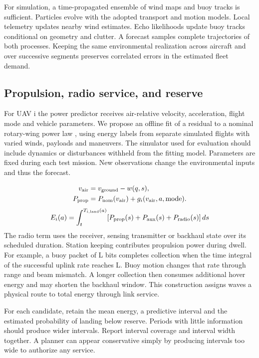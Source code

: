 \documentclass[journal]{IEEEtran}
\begin{document}
For simulation, a time-propagated ensemble of wind maps and buoy tracks is sufficient. Particles evolve with the adopted transport and motion models. Local telemetry updates nearby wind estimates. Echo likelihoods update buoy tracks conditional on geometry and clutter. A forecast samples complete trajectories of both processes. Keeping the same environmental realization across aircraft and over successive segments preserves correlated errors in the estimated fleet demand.

\subsection{Propulsion, radio service, and reserve}
For UAV i the power predictor receives air-relative velocity, acceleration, flight mode and vehicle parameters. We propose an offline fit of a residual to a nominal rotary-wing power law \cite{r3}, using energy labels from separate simulated flights with varied winds, payloads and maneuvers. The simulator used for evaluation should include dynamics or disturbances withheld from the fitting model. Parameters are fixed during each test mission. New observations change the environmental inputs and thus the forecast.

\begin{equation}\begin{aligned}v_{\rm air}&=v_{\rm ground}-w(q,s),\\P_{\rm prop}&=P_{\rm nom}(v_{\rm air})+g_i(v_{\rm air},a,\mathrm{mode}).\end{aligned}\end{equation}
\begin{equation}E_i(a)=\int_{t}^{T_{i,\rm land}(a)}[P_{\rm prop}(s)+P_{\rm aux}(s)+P_{\rm radio}(s)]\,ds\end{equation}
The radio term uses the receiver, sensing transmitter or backhaul state over its scheduled duration. Station keeping contributes propulsion power during dwell. For example, a buoy packet of L bits completes collection when the time integral of the successful uplink rate reaches L. Buoy motion changes that rate through range and beam mismatch. A longer collection then consumes additional hover energy and may shorten the backhaul window. This construction assigns waves a physical route to total energy through link service.

For each candidate, retain the mean energy, a predictive interval and the estimated probability of landing below reserve. Periods with little information should produce wider intervals. Report interval coverage and interval width together. A planner can appear conservative simply by producing intervals too wide to authorize any service.
\end{document}
